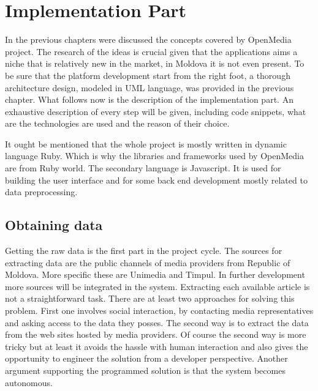 \section{Implementation Part}
In the previous chapters were discussed the concepts covered by OpenMedia project. The research of the ideas is crucial given that the applications aims a niche that is relatively new in the market, in Moldova it is not even present. To be sure that the platform development start from the right foot, a thorough architecture design, modeled in UML language, was provided in the previous chapter. What follows now is the description of the implementation part. An exhaustive description of every step will be given, including code snippets, what are the technologies are used and the reason of their choice.

It ought be mentioned that the whole project is mostly written in dynamic language Ruby. Which is why the libraries and frameworks used by OpenMedia are from Ruby world. The secondary language is Javascript. It is used for building the user interface and for some back end development mostly related to data preprocessing.

\subsection{Obtaining data}
Getting the raw data is the first part in the project cycle. The sources for extracting data are the public channels of media providers from Republic of Moldova. More specific these are Unimedia and Timpul. In further development more sources will be integrated in the system. Extracting each available article is not a straightforward task. There are at least two approaches for solving this problem. First one involves social interaction, by contacting media representatives and asking access to the data they posses. The second way is to extract the data from the web sites hosted by media providers. Of course the second way is more tricky but at least it avoids the hassle with human interaction and also gives the opportunity to engineer the solution from a developer perspective. Another argument supporting the programmed solution is that the system becomes autonomous.

